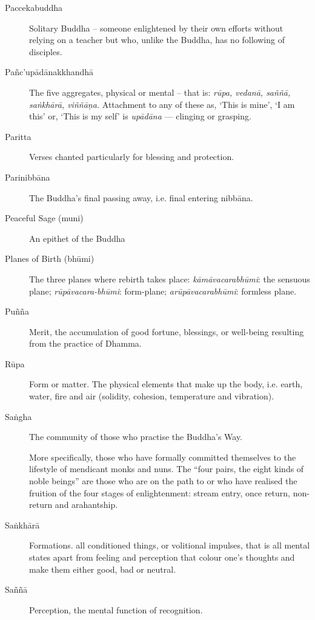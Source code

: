 \begin{description}
\item[Paccekabuddha] Solitary Buddha – someone enlightened by their own
  efforts without relying on a teacher but who, unlike the Buddha, has
  no following of disciples.

\item[Pañc’upādānakkhandhā] The five aggregates, physical or mental –
  that is: \emph{rūpa, vedanā, saññā, saṅkhārā, viññāṇa.} Attachment to
  any of these as, ‘This is mine’, ‘I am this’ or, ‘This is my self’ is
  \emph{upādāna} — clinging or grasping.

\item[Paritta] Verses chanted particularly for blessing and protection.

\item[Parinibbāna] The Buddha’s final passing away, i.e. final entering
  nibbāna.

\item[Peaceful Sage (muni)] An epithet of the Buddha

\item[Planes of Birth (bhūmi)] The three planes where rebirth takes
  place: \emph{kāmāvacarabhūmi}: the sensuous plane;
  \emph{rūpāvacara-bhūmi}: form-plane; \emph{arūpāvacarabhūmi}: formless
  plane.

\item[Puñña] Merit, the accumulation of good fortune, blessings, or
  well-being resulting from the practice of Dhamma.

\item[Rūpa] Form or matter. The physical elements that make up the body,
  i.e. earth, water, fire and air (solidity, cohesion, temperature and
  vibration).

\item[Saṅgha] The community of those who practise the Buddha’s Way.

  More specifically, those who have formally committed themselves to the
lifestyle of mendicant monks and nuns. The “four pairs, the eight kinds of
noble beings” are those who are on the path to or who have realised the
fruition of the four stages of enlightenment: stream entry, once return,
non-return and arahantship.

\item[Saṅkhārā] Formations. all conditioned things, or volitional
  impulses, that is all mental states apart from feeling and perception
  that colour one’s thoughts and make them either good, bad or neutral.

\item[Saññā] Perception, the mental function of recognition.


\end{description}
